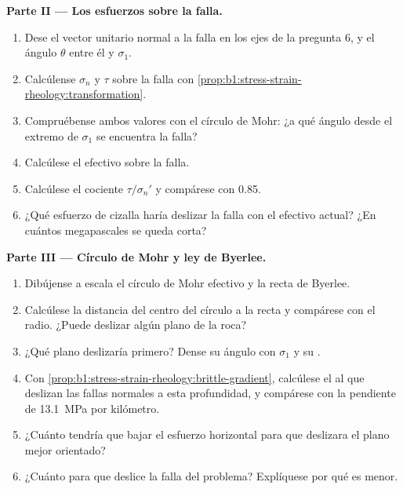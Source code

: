 \begin{problem}
\medskip
\noindent\textbf{Parte II --- Los esfuerzos sobre la falla.}
\begin{enumerate}[resume]
  \item Dese el vector unitario normal a la falla en los ejes de la pregunta 6, y el ángulo $\theta$ entre él y $\sigma_1$.
  \item Calcúlense $\sigma_n$ y $\tau$ sobre la falla con \cref{prop:b1:stress-strain-rheology:transformation}.
  \item Compruébense ambos valores con el círculo de Mohr: ¿a qué ángulo desde el extremo de $\sigma_1$ se encuentra la falla?
  \item Calcúlese el  efectivo sobre la falla.
  \item Calcúlese el cociente $\tau/\sigma_n'$ y compárese con 0.85.
  \item ¿Qué esfuerzo de cizalla haría deslizar la falla con el  efectivo actual? ¿En cuántos megapascales se queda corta?
\end{enumerate}

\medskip
\noindent\textbf{Parte III --- Círculo de Mohr y ley de Byerlee.}
\begin{enumerate}[resume]
  \item Dibújense a escala el círculo de Mohr efectivo y la recta de Byerlee.
  \item Calcúlese la distancia del centro del círculo a la recta y compárese con el radio. ¿Puede deslizar algún plano de la roca?
  \item ¿Qué plano deslizaría primero? Dense su ángulo con $\sigma_1$ y su .
  \item Con \cref{prop:b1:stress-strain-rheology:brittle-gradient}, calcúlese el  al que deslizan las fallas
        normales a esta profundidad, y compárese con la pendiente de \qty{13.1}{MPa} por kilómetro.
  \item ¿Cuánto tendría que bajar el esfuerzo horizontal para que deslizara el plano mejor orientado?
  \item ¿Cuánto para que deslice la falla del problema? Explíquese por qué es menor.
\end{enumerate}


\end{problem}

